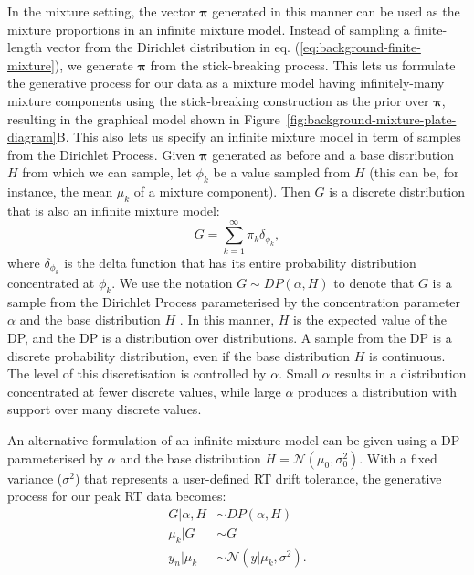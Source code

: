 In the mixture setting, the vector $\boldsymbol{\pi}$ generated in this manner can be used as the mixture proportions in an infinite mixture model. Instead of sampling a finite-length vector from the Dirichlet distribution in eq. (\ref{eq:background-finite-mixture}), we generate $\boldsymbol{\pi}$ from the stick-breaking process. This lets us formulate the generative process for our data as a mixture model having infinitely-many mixture components using the stick-breaking construction as the prior over $\boldsymbol{\pi}$, resulting in the graphical model shown in Figure~\ref{fig:background-mixture-plate-diagram}B. This also lets us specify an infinite mixture model in term of samples from the Dirichlet Process. Given $\boldsymbol{\pi}$ generated as before and a base distribution $H$ from which we can sample, let $\phi_k$ be a value sampled from $H$ (this can be, for instance, the mean $\mu_k$ of a mixture component). Then $G$ is a discrete distribution that is also an infinite mixture model:
\begin{equation}
G=\sum_{k=1}^{\infty} \pi_k \delta_{\phi_k},
\end{equation}
where $\delta_{\phi_k}$ is the delta function that has its entire probability distribution concentrated at $\phi_k$. We use the notation $G \sim DP(\alpha, H)$ to denote that $G$ is a sample from the Dirichlet Process parameterised by the concentration parameter $\alpha$ and the base distribution $H$ \cite{teh2011dirichlet}. In this manner, $H$ is the expected value of the DP, and the DP is a distribution over distributions. A sample from the DP is a discrete probability distribution, even if the base distribution $H$ is continuous. The level of this discretisation is controlled by $\alpha$. Small $\alpha$ results in a distribution concentrated at fewer discrete values, while large $\alpha$ produces a distribution with support over many discrete values.

An alternative formulation of an infinite mixture model can be given using a DP parameterised by $\alpha$ and the base distribution $H=\mathcal{N}(\mu_0, \sigma_0^2)$. With a fixed variance ($\sigma^2$) that represents a user-defined RT drift tolerance, the generative process for our peak RT data becomes:
\begin{equation}
\begin{aligned}
G \vert \alpha, H  &\sim DP(\alpha, H) \\
\mu_k \vert G     &\sim G \\
y_n \vert \mu_k  &\sim \mathcal{N}(y \vert \mu_k, \sigma^2).
\end{aligned}
\label{eq:background-infinite-mixture-dp}
\end{equation}

